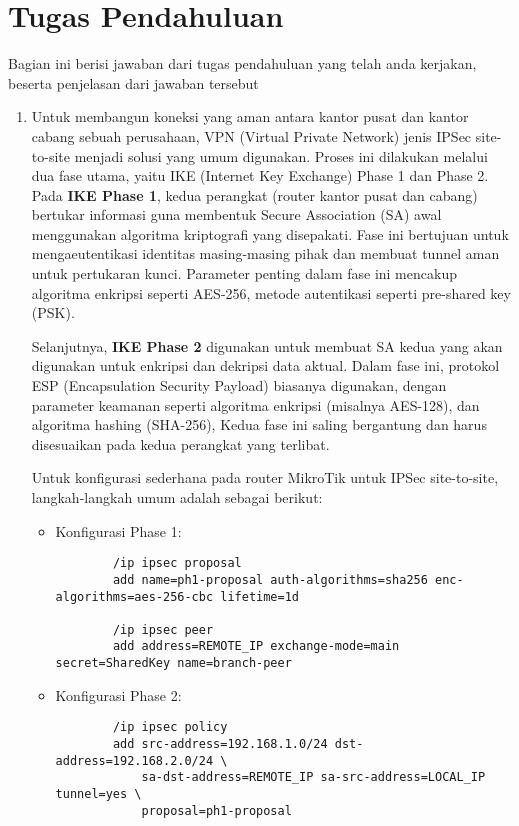 \section{Tugas Pendahuluan}
Bagian ini berisi jawaban dari tugas pendahuluan yang telah anda kerjakan, beserta penjelasan dari jawaban tersebut
\begin{enumerate}
	\item 
	Untuk membangun koneksi yang aman antara kantor pusat dan kantor cabang sebuah perusahaan, VPN 
	(Virtual Private Network) jenis IPSec site-to-site menjadi solusi yang umum digunakan. Proses ini 
	dilakukan melalui dua fase utama, yaitu IKE (Internet Key Exchange) Phase 1 dan Phase 2. Pada 
	\textbf{IKE Phase 1}, kedua perangkat (router kantor pusat dan cabang) bertukar informasi guna 
	membentuk Secure Association (SA) awal menggunakan algoritma kriptografi yang disepakati. Fase 
	ini bertujuan untuk mengaeutentikasi identitas masing-masing pihak dan membuat tunnel aman untuk 
	pertukaran kunci. Parameter penting dalam fase ini mencakup algoritma enkripsi seperti AES-256, 
	metode autentikasi seperti pre-shared key (PSK).

	Selanjutnya, \textbf{IKE Phase 2} digunakan untuk membuat SA kedua yang akan digunakan untuk 
	enkripsi dan dekripsi data aktual. Dalam fase ini, protokol ESP (Encapsulation Security Payload) 
	biasanya digunakan, dengan parameter keamanan seperti algoritma enkripsi (misalnya AES-128), dan
	algoritma hashing (SHA-256), Kedua fase ini saling bergantung dan harus disesuaikan pada kedua 
	perangkat yang terlibat.

	Untuk konfigurasi sederhana pada router MikroTik untuk IPSec site-to-site, langkah-langkah 
	umum adalah sebagai berikut:

	\begin{itemize}
		\item Konfigurasi Phase 1: 
		\begin{verbatim}
		/ip ipsec proposal
		add name=ph1-proposal auth-algorithms=sha256 enc-algorithms=aes-256-cbc lifetime=1d

		/ip ipsec peer
		add address=REMOTE_IP exchange-mode=main secret=SharedKey name=branch-peer
		\end{verbatim}
		
		\item Konfigurasi Phase 2:
		\begin{verbatim}
		/ip ipsec policy
		add src-address=192.168.1.0/24 dst-address=192.168.2.0/24 \
			sa-dst-address=REMOTE_IP sa-src-address=LOCAL_IP tunnel=yes \
			proposal=ph1-proposal
		\end{verbatim}
	\end{itemize}


\end{enumerate}
